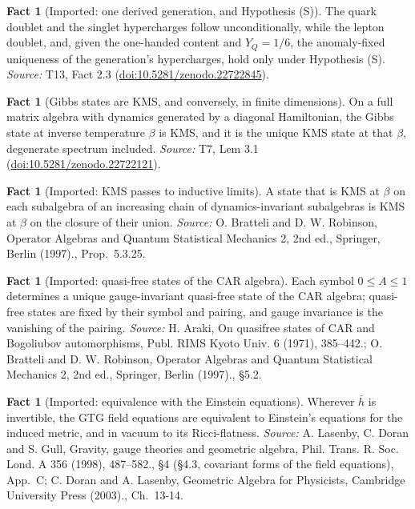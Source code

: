 \documentclass[11pt]{article}
\theoremstyle{definition}
\newtheorem{fact}[theorem]{Fact}
\theoremstyle{plain}
\providecommand{\hb}{}\renewcommand{\hb}{\bar{h}}
\begin{document}
\begin{fact}[Imported: one derived generation, and Hypothesis (S)]\label{c:families.imported-one-derived-generation-hypothesis-s}
The quark doublet and the singlet hypercharges follow unconditionally, while the lepton doublet, and, given the one-handed content and $Y_{Q} = 1/6$, the anomaly-fixed uniqueness of the generation's hypercharges, hold only under Hypothesis (S).
\emph{Source:} T13, Fact 2.3 (\href{https://doi.org/10.5281/zenodo.22722845}{doi:10.5281/zenodo.22722845}).
\end{fact}

\begin{fact}[Gibbs states are KMS, and conversely, in finite dimensions]\label{c:hawking.gibbs-states-are-kms-conversely-finite}
On a full matrix algebra with dynamics generated by a diagonal Hamiltonian, the Gibbs state at inverse temperature $\beta$ is KMS, and it is the unique KMS state at that $\beta$, degenerate spectrum included.
\emph{Source:} T7, Lem 3.1 (\href{https://doi.org/10.5281/zenodo.22722121}{doi:10.5281/zenodo.22722121}).
\end{fact}

\begin{fact}[Imported: KMS passes to inductive limits]\label{c:hawking.imported-kms-passes-inductive-limits}
A state that is KMS at $\beta$ on each subalgebra of an increasing chain of dynamics-invariant subalgebras is KMS at $\beta$ on the closure of their union.
\emph{Source:} O. Bratteli and D. W. Robinson, Operator Algebras and Quantum Statistical Mechanics 2, 2nd ed., Springer, Berlin (1997)., Prop.~5.3.25.
\end{fact}

\begin{fact}[Imported: quasi-free states of the CAR algebra]\label{c:hawking.imported-quasi-free-states-car-algebra}
Each symbol $0 \le A \le 1$ determines a unique gauge-invariant quasi-free state of the CAR algebra; quasi-free states are fixed by their symbol and pairing, and gauge invariance is the vanishing of the pairing.
\emph{Source:} H. Araki, On quasifree states of CAR and Bogoliubov automorphisms, Publ. RIMS Kyoto Univ. 6 (1971), 385--442.; O. Bratteli and D. W. Robinson, Operator Algebras and Quantum Statistical Mechanics 2, 2nd ed., Springer, Berlin (1997)., \S 5.2.
\end{fact}

\begin{fact}[Imported: equivalence with the Einstein equations]\label{c:interior.imported-equivalence-einstein-equations}
Wherever $\hb$ is invertible, the GTG field equations are equivalent to Einstein's equations for the induced metric, and in vacuum to its Ricci-flatness.
\emph{Source:} A. Lasenby, C. Doran and S. Gull, Gravity, gauge theories and geometric algebra, Phil. Trans. R. Soc. Lond. A 356 (1998), 487--582., \S 4 (\S 4.3, covariant forms of the field equations), App.~C; C. Doran and A. Lasenby, Geometric Algebra for Physicists, Cambridge University Press (2003)., Ch.~13-14.
\end{fact}
\end{document}
